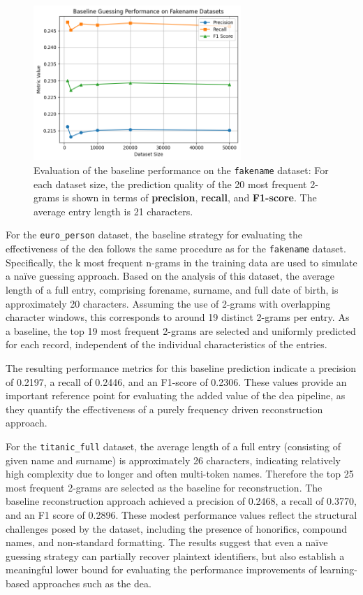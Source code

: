 \begin{figure}[H]
    \centering
    \includegraphics[width=0.7\textwidth]{img/fakename_analysis.png}
    \caption{Evaluation of the baseline performance on the \texttt{fakename} dataset: For each dataset size, the prediction quality of the 20 most frequent 2-grams is shown in terms of \textbf{precision}, \textbf{recall}, and \textbf{F1-score}. The average entry length is 21 characters.}
    \label{fig:baseline_metrics}
\end{figure}

For the \texttt{euro\_person} dataset, the baseline strategy for evaluating the effectiveness of the \ac{dea} follows the same procedure as for the \texttt{fakename} dataset.
Specifically, the k most frequent n-grams in the training data are used to simulate a naïve guessing approach.
Based on the analysis of this dataset, the average length of a full entry, comprising forename, surname, and full date of birth, is approximately 20 characters.
Assuming the use of 2-grams with overlapping character windows, this corresponds to around 19 distinct 2-grams per entry.
As a baseline, the top 19 most frequent 2-grams are selected and uniformly predicted for each record, independent of the individual characteristics of the entries.

The resulting performance metrics for this baseline prediction indicate a precision of 0.2197, a recall of 0.2446, and an F1-score of 0.2306.
These values provide an important reference point for evaluating the added value of the \ac{dea} pipeline, as they quantify the effectiveness of a purely frequency driven reconstruction approach.

For the \texttt{titanic\_full} dataset, the average length of a full entry (consisting of given name and surname) is approximately 26 characters, indicating relatively high complexity due to longer and often multi-token names.
Therefore the top 25 most frequent 2-grams are selected as the baseline for reconstruction.
The baseline reconstruction approach achieved a precision of 0.2468, a recall of 0.3770, and an F1 score of 0.2896.
These modest performance values reflect the structural challenges posed by the dataset, including the presence of honorifics, compound names, and non-standard formatting.
The results suggest that even a naïve guessing strategy can partially recover plaintext identifiers, but also establish a meaningful lower bound for evaluating the performance improvements of learning-based approaches such as the \ac{dea}.

